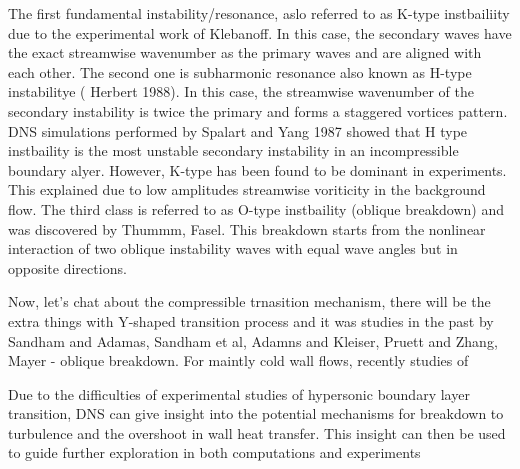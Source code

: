 The first fundamental instability/resonance, aslo referred to as K-type instbailiity due to the experimental work of Klebanoff. In this case, the secondary waves have the exact streamwise wavenumber as the primary waves and are aligned with each other. The second one is subharmonic resonance also known as H-type instabilitye ( Herbert 1988). In this case, the streamwise wavenumber of the secondary instability is twice the primary and forms a staggered vortices pattern. DNS simulations performed by Spalart and Yang 1987 showed that H type instbaility is the most unstable secondary instability in an incompressible boundary alyer. However, K-type has been found to be dominant in experiments. This explained due to low amplitudes streamwise voriticity in the background flow. The third class is referred to as O-type instbaility (oblique breakdown) and was discovered by Thummm, Fasel. This breakdown starts from the nonlinear interaction of two oblique instability waves with equal wave angles but in opposite directions. 

Now, let's chat about the compressible trnasition mechanism, there will be the extra things with Y-shaped transition process and it was studies in the past by Sandham and Adamas, Sandham et al, Adamns and Kleiser, Pruett and Zhang, Mayer - oblique breakdown. For maintly cold  wall flows, recently studies of 

Due to the difficulties of experimental studies of hypersonic boundary layer transition, DNS can give insight into the potential mechanisms for breakdown to turbulence and the overshoot in wall heat transfer. This insight can then be used to guide further exploration in both computations and experiments



